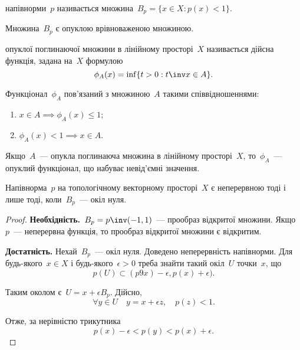 \begin{definition}
     напівнорми~$p$ називається множина~$B_p = \{x \in X: p(x) < 1\}$.
\end{definition}

\begin{remark}
    Множина~$B_p$ є опуклою врівноваженою множиною.
\end{remark}

\begin{definition}
     опуклої поглинаючої множини в лінійному просторі~$X$ називається дійсна функція, задана на~$X$ формулою
    \begin{equation*}
        \phi_A(x) = \inf \{ t > 0: t\inv x \in A\}.
    \end{equation*}
\end{definition}

\begin{remark}
    Функціонал~$\phi_A$ пов'язаний з множиною~$A$ такими співвідношеннями:
    \begin{enumerate}
        \item $x \in A \implies \phi_A(x) \le 1$;
        \item $\phi_A(x) < 1 \implies x \in A$.
    \end{enumerate}
\end{remark}

\begin{remark}
    Якщо~$A$~--- опукла поглинаюча множина в лінійному просторі~$X$, то~$\phi_A$~--- опуклий функціонал, що набуває невід'ємні значення.
\end{remark}

\begin{theorem}
    Напівнорма~$p$ на топологічному векторному просторі~$X$ є неперервною тоді і лише тоді, коли~$B_p$~--- окіл нуля.
\end{theorem}

\begin{proof}
    \textbf{Необхідність.}~$B_p = p\inv (-1,1)$~--- прообраз відкритої множини. Якщо~$p$~--- неперервна функція, то прообраз відкритої множини є відкритим.

    \textbf{Достатність.} Нехай~$B_p$~--- окіл нуля. Доведено неперервність напівнорми. Для будь-якого~$x \in X$ і будь-якого~$\epsilon > 0$ треба знайти такий окіл~$U$ точки~$x$, що
    \begin{equation*}
        p(U) \subset (p9x) - \epsilon, p(x) + \epsilon).
    \end{equation*}

    Таким околом є~$U = x + \epsilon B_p$. Дійсно,
    \begin{equation*}
        \forall y \in U \quad y = x + \epsilon z, \quad p(z) < 1.
    \end{equation*}

    Отже, за нерівністю трикутника
    \begin{equation*}
        p(x) - \epsilon < p(y) < p(x) + \epsilon.
    \end{equation*}
\end{proof}

